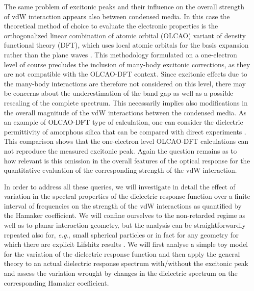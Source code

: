 \documentclass[letterpaper,twocolumn,amsmath,amssymb,floatfix,aps,superscriptaddress]{revtex4}
\begin{document}
The same problem of excitonic peaks and their influence on the overall strength of vdW interaction appears also between condensed media. In this case the theoretical method of choice to evaluate the electronic properties is the orthogonalized linear combination of atomic orbital (OLCAO) variant of density functional theory (DFT), which uses local atomic orbitals for the basis expansion rather than the plane waves \cite{DFT}.  This methodology formulated on a one-electron level of course precludes the inclusion of many-body excitonic corrections, as they are not compatible with the OLCAO-DFT context. Since excitonic effects due to the many-body interactions are therefore not considered on this level, there may be concerns about the underestimation of the band gap as well as a possible rescaling of the complete spectrum. This necessarily implies also modifications in the overall magnitude of the vdW interactions between the condensed media. As an example of OLCAO-DFT type of calculation, one can consider the dielectric permittivity of amorphous silica \cite{silica} that can be compared with direct experiments \cite{Tan}. This comparison shows that the one-electron level OLCAO-DFT calculations can not reproduce the measured excitonic peak. Again the question remains as to how relevant is this omission in the overall features of the optical response for the quantitative evaluation of the corresponding strength of the vdW interaction.

In order to address all these queries, we will investigate in detail the effect of variation in the spectral properties of the dielectric response function over a finite interval of frequencies on the strength of the vdW interactions as quantified by the Hamaker coefficient. We will confine ourselves to the non-retarded regime as well as to planar interaction geometry, but the analysis can be straightforwardly repeated also for, {\sl e.g.}, small spherical particles or in fact for any geometry for which there are explicit Lifshitz results \cite{Parsegian}. We will first analyse a simple toy model for the variation of the dielectric response function and then apply the general theory to an actual dielectric response spectrum with/without the excitonic peak and assess the variation wrought by changes in the dielectric spectrum on the corresponding Hamaker coefficient.

\end{document}
